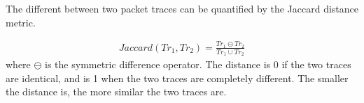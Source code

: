The different between two packet traces can be quantified by the Jaccard distance
metric.

\begin{align}
  Jaccard(Tr_1, Tr_2) = \frac{Tr_1 \ominus Tr_2}{Tr_1 \cup Tr_2}
\end{align}
where $\ominus$ is the symmetric difference operator.
The distance is 0 if the
two traces are identical, and is 1 when the two traces are completely different.
The smaller the distance is, the more similar the two traces are.

